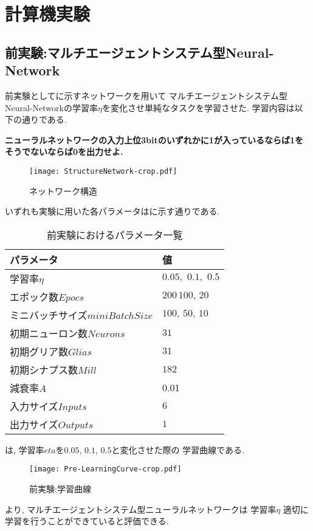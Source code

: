 \chapter{計算機実験}
\section{前実験:マルチエージェントシステム型Neural-Network}
前実験としてに示すネットワークを用いて
マルチエージェントシステム型Neural-Networkの学習率$\eta$を変化させ単純なタスクを学習させた.
学習内容は以下の通りである.
\begin{center}
  \textbf{ニューラルネットワークの入力上位3bitのいずれかに1が入っているならば1をそうでないならば0を出力せよ.}  
\end{center} 
\begin{figure}[H]
  \centering
  \texttt{[image: StructureNetwork-crop.pdf]}
  \caption{ネットワーク構造}
  \label{fig:Struct}
\end{figure}
いずれも実験に用いた各パラメータはに示す通りである.
\begin{table}[H]
  \caption{前実験におけるパラメータ一覧}
  \label{tab:Pre-Pram}
  \centering
   \begin{tabular}{ll}
    \toprule
      パラメータ&値\\\midrule\midrule
      学習率$\eta$&$0.05,\,\, 0.1,\,\,0.5$\\
      エポック数$Epocs$&$200\,100,\,20$\\
      ミニバッチサイズ$miniBatchSize$&$100,\,50,\,10$\\
      初期ニューロン数$Neurons$&$31$\\
      初期グリア数$Glias$&$31$\\
      初期シナプス数$Mill$&$182$\\
      減衰率$A$&0.01\\
      入力サイズ$Inputs$&$6$\\
      出力サイズ$Outputs$&$1$\\
    \bottomrule
   \end{tabular}
 \end{table}
は, 学習率$eta$を$0.05$, $0.1$, $0.5$と変化させた際の
学習曲線である.
\begin{figure}[H]
    \centering
    \texttt{[image: Pre-LearningCurve-crop.pdf]}
    \caption{前実験:学習曲線}
    \label{fig:Pre-LearningCurve}
\end{figure}
より, マルチエージェントシステム型ニューラルネットワークは
学習率$\eta$
適切に学習を行うことができていると評価できる.
\clearpage
